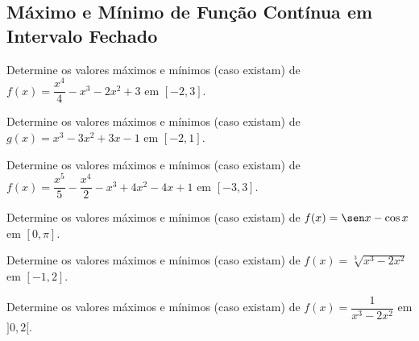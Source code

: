 \clearpage

\subsection{Máximo e Mínimo de Função Contínua em Intervalo Fechado}

\begin{exercicio}[1]
Determine os valores máximos e mínimos (caso existam) de $f(x) = \dfrac{x^4}{4} - x^3 - 2x^2 + 3$ em $[-2, 3]$.
\end{exercicio}

\begin{exercicio}[2]
Determine os valores máximos e mínimos (caso existam) de $g(x) = x^3 - 3x^2 + 3x - 1$ em $[-2, 1]$.
\end{exercicio}

\begin{exercicio}[3]
Determine os valores máximos e mínimos (caso existam) de $f(x) = \dfrac{x^5}{5} - \dfrac{x^4}{2} - x^3 + 4x^2 - 4x + 1$ em $[-3, 3]$.
\end{exercicio}

\begin{exercicio}[4]
Determine os valores máximos e mínimos (caso existam) de $f(x) = \sen x - \cos x$ em $[0, \pi]$.
\end{exercicio}

\begin{exercicio}[5]
Determine os valores máximos e mínimos (caso existam) de $f(x) = \sqrt[3]{x^3 - 2x^2}$ em $[-1, 2]$.
\end{exercicio}

\begin{exercicio}[6]
Determine os valores máximos e mínimos (caso existam) de $f(x) = \dfrac{1}{x^3 - 2x^2}$ em ${]0, 2[}$.
\end{exercicio}
